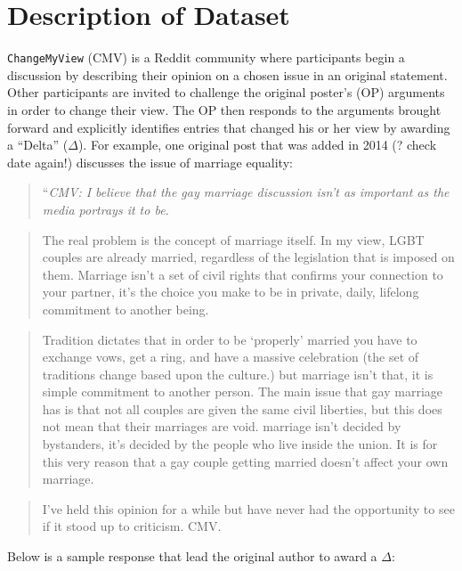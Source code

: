 \documentclass[12pt,]{article}
\begin{document}
\section{Description of Dataset}\label{description-of-dataset}

\texttt{ChangeMyView} (CMV) is a Reddit community where participants
begin a discussion by describing their opinion on a chosen issue in an
original statement. Other participants are invited to challenge the
original poster's (OP) arguments in order to change their view. The OP
then responds to the arguments brought forward and explicitly identifies
entries that changed his or her view by awarding a ``Delta''
(\(\Delta\)). For example, one original post that was added in 2014 (?
check date again!) discusses the issue of marriage equality:

\begin{quote}
``\emph{CMV: I believe that the gay marriage discussion isn't as
important as the media portrays it to be.}
\end{quote}

\begin{quote}
The real problem is the concept of marriage itself. In my view, LGBT
couples are already married, regardless of the legislation that is
imposed on them. Marriage isn't a set of civil rights that confirms your
connection to your partner, it's the choice you make to be in private,
daily, lifelong commitment to another being.
\end{quote}

\begin{quote}
Tradition dictates that in order to be `properly' married you have to
exchange vows, get a ring, and have a massive celebration (the set of
traditions change based upon the culture.) but marriage isn't that, it
is simple commitment to another person. The main issue that gay marriage
has is that not all couples are given the same civil liberties, but this
does not mean that their marriages are void. marriage isn't decided by
bystanders, it's decided by the people who live inside the union. It is
for this very reason that a gay couple getting married doesn't affect
your own marriage.
\end{quote}

\begin{quote}
I've held this opinion for a while but have never had the opportunity to
see if it stood up to criticism. CMV.
\end{quote}

Below is a sample response that lead the original author to award a
\(\Delta\):
\end{document}
